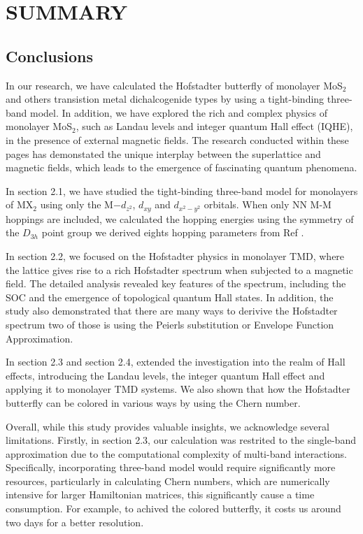 \documentclass{report}
\begin{document}
\chapter{SUMMARY}
\section{Conclusions}
In our research, we have calculated the Hofstadter butterfly of monolayer MoS$_{2}$ and others transistion metal dichalcogenide types by using a tight-binding three-band model. In addition, we have explored the rich and complex physics of monolayer MoS$_2$, such as Landau levels and integer quantum Hall effect (IQHE), in the presence of external magnetic fields. The research conducted within these pages has demonstated the unique interplay between the superlattice and magnetic fields, which leads to the emergence of fascinating quantum phenomena.

In section 2.1, we have studied the tight-binding three-band model for monolayers of MX$_{2}$ using only the M$-d_{z^{2}}$, $d_{xy}$ and $d_{x^{2} - y{^2}}$ orbitals. When only NN M-M hoppings are included, we calculated the hopping energies using the symmetry of the $D_{3h}$ point group we derived eights hopping parameters from Ref \cite{PhysRevB.88.085433}.

In section 2.2, we focused on the Hofstadter physics in monolayer TMD, where the lattice gives rise to a rich Hofstadter spectrum when subjected to a magnetic field. The detailed analysis revealed key features of the spectrum, including the SOC and the emergence of topological quantum Hall states. In addition, the study also demonstrated that there are many ways to derivive the Hofstadter spectrum two of those is using the Peierls substitution or Envelope Function Approximation.

In section 2.3 and section 2.4, extended the investigation into the realm of Hall effects, introducing the Landau levels, the integer quantum Hall effect and applying it to monolayer TMD systems. We also shown that how the Hofstadter butterfly can be colored in various ways by using the Chern number.

Overall, while this study provides valuable insights, we acknowledge several limitations. Firstly, in section 2.3, our calculation was restrited to the single-band approximation due to the computational complexity of multi-band interactions. Specifically, incorporating three-band model would require significantly more resources, particularly in calculating Chern numbers, which are numerically intensive for larger Hamiltonian matrices, this significantly cause a time consumption. For example, to achived the colored butterfly, it costs us around two days for a better resolution.
\end{document}
